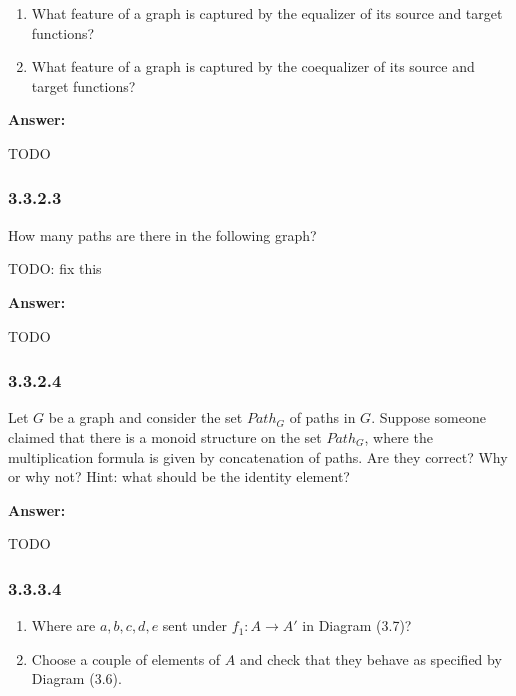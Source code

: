\documentclass{article}
\newcommand{\vsp}[0]{\vspace*{10pt}\par}
\newcommand{\exercise}[1]{\subsubsection*{#1}}
\newcommand{\ans}[0]{\vsp\textbf{Answer: }\vsp}
\newcommand{\ei}{\item}
\newcommand{\es}{\begin{enumerate}[label=(\alph*)]\ei}
\newcommand{\ee}{\end{enumerate}}
\begin{document}
\es What feature of a graph is captured by the equalizer of its source and
    target functions?
\ei What feature of a graph is captured by the coequalizer of its source and
    target functions?
\ee


\ans

TODO

\exercise{3.3.2.3}

How many paths are there in the following graph?

TODO: fix this

\ans

TODO

\exercise{3.3.2.4}

Let $G$ be a graph and consider the set $Path_G$ of paths in $G$. Suppose
someone claimed that there is a monoid structure on the set $Path_G$, where the
multiplication formula is given by concatenation of paths. Are they correct? Why
or why not? Hint: what should be the identity element?


\ans

TODO

\exercise{3.3.3.4}

\es Where are $a, b, c, d, e$ sent under $f_1 : A \to A'$ in Diagram (3.7)?
\ei Choose a couple of elements of $A$ and check that they behave as specified
    by Diagram (3.6).
\ee


\vsp
\vsp
\vsp
\vsp

\printbibliography
\end{document}
